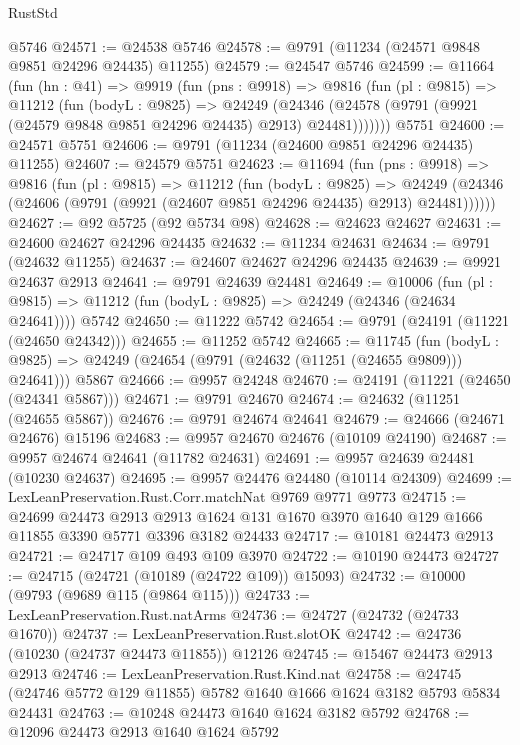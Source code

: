\begin{lexlean}{RustStd}
\begin{coremodule}
    @5746
@24571 := @24538 @5746
@24578 := @9791 (@11234 (@24571 @9848 @9851 @24296 @24435) @11255)
@24579 := @24547 @5746
@24599 := @11664
    (fun (hn : @41) =>
    @9919
      (fun (pns : @9918) =>
      @9816
        (fun (pl : @9815) =>
        @11212
          (fun (bodyL : @9825) =>
          @24249
            (@24346 (@24578 (@9791 (@9921 (@24579 @9848 @9851 @24296 @24435) @2913) @24481)))))))
    @5751
@24600 := @24571 @5751
@24606 := @9791 (@11234 (@24600 @9851 @24296 @24435) @11255)
@24607 := @24579 @5751
@24623 := @11694
    (fun (pns : @9918) =>
    @9816
      (fun (pl : @9815) =>
      @11212
        (fun (bodyL : @9825) =>
        @24249 (@24346 (@24606 (@9791 (@9921 (@24607 @9851 @24296 @24435) @2913) @24481))))))
@24627 := @92 @5725 (@92 @5734 @98)
@24628 := @24623 @24627
@24631 := @24600 @24627 @24296 @24435
@24632 := @11234 @24631
@24634 := @9791 (@24632 @11255)
@24637 := @24607 @24627 @24296 @24435
@24639 := @9921 @24637 @2913
@24641 := @9791 @24639 @24481
@24649 := @10006
    (fun (pl : @9815) => @11212 (fun (bodyL : @9825) => @24249 (@24346 (@24634 @24641))))
    @5742
@24650 := @11222 @5742
@24654 := @9791 (@24191 (@11221 (@24650 @24342)))
@24655 := @11252 @5742
@24665 := @11745
    (fun (bodyL : @9825) => @24249 (@24654 (@9791 (@24632 (@11251 (@24655 @9809))) @24641)))
    @5867
@24666 := @9957 @24248
@24670 := @24191 (@11221 (@24650 (@24341 @5867)))
@24671 := @9791 @24670
@24674 := @24632 (@11251 (@24655 @5867))
@24676 := @9791 @24674 @24641
@24679 := @24666 (@24671 @24676) @15196
@24683 := @9957 @24670 @24676 (@10109 @24190)
@24687 := @9957 @24674 @24641 (@11782 @24631)
@24691 := @9957 @24639 @24481 (@10230 @24637)
@24695 := @9957 @24476 @24480 (@10114 @24309)
@24699 := LexLeanPreservation.Rust.Corr.matchNat @9769 @9771 @9773
@24715 := @24699
    @24473
    @2913
    @2913
    @1624
    @131
    @1670
    @3970
    @1640
    @129
    @1666
    @11855
    @3390
    @5771
    @3396
    @3182
    @24433
@24717 := @10181 @24473 @2913
@24721 := @24717 @109 @493 @109 @3970
@24722 := @10190 @24473
@24727 := @24715 (@24721 (@10189 (@24722 @109)) @15093)
@24732 := @10000 (@9793 (@9689 @115 (@9864 @115)))
@24733 := LexLeanPreservation.Rust.natArms
@24736 := @24727 (@24732 (@24733 @1670))
@24737 := LexLeanPreservation.Rust.slotOK
@24742 := @24736 (@10230 (@24737 @24473 @11855)) @12126
@24745 := @15467 @24473 @2913 @2913
@24746 := LexLeanPreservation.Rust.Kind.nat
@24758 := @24745 (@24746 @5772 @129 @11855) @5782 @1640 @1666 @1624 @3182 @5793 @5834 @24431
@24763 := @10248 @24473 @1640 @1624 @3182 @5792
@24768 := @12096 @24473 @2913 @1640 @1624 @5792

\end{coremodule}
\end{lexlean}
